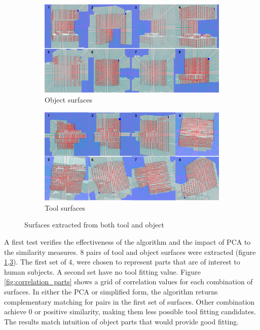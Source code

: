 \documentclass[11]{article}
\begin{document}
\begin{figure}[!h]
  \centering
  \begin{subfigure}{1\textwidth}
    \includegraphics[width=1\linewidth]{figures/object_parts.png}
    \caption{Object surfaces}
    \label{fig:obj_parts}
  \end{subfigure}
  \begin{subfigure}{1\textwidth}
    \includegraphics[width=1\linewidth]{figures/tool_parts.png}
    \caption{Tool surfaces}
    \label{fig:tool_part}
  \end{subfigure}
  \caption{Surfaces extracted from both tool and object}
\end{figure}

A first test verifies the effectiveness of the algorithm and the impact of PCA to the similarity measures. 
$8$ pairs of tool and object surfaces were extracted (figure \ref{fig:obj_parts},\ref{fig:tool_part}). 
The first set of $4$, were chosen to represent parts that are of interest to human subjects. 
A second set have no tool fitting value. 
Figure \ref{fig:correlation_parts} shows a grid of correlation values for each combination of surfaces. 
In either the PCA or simplified form, the algorithm returns complementary matching for pairs in the first set of surfaces. 
Other combination achieve 0 or positive similarity, making them less possible tool fitting candidates. 
The results match intuition of object parts that would provide good fitting. 
\end{document}
